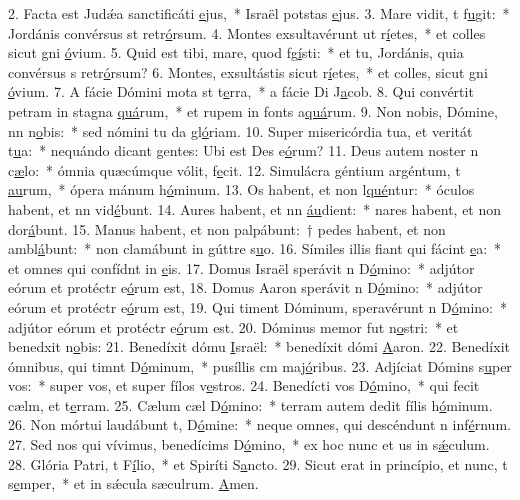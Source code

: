 2. Facta est Judǽa sanctificáti \uline{e}jus,~* Israël potstas \uline{e}jus.
3. Mare vidit, t f\uline{u}git:~* Jordánis convérsus st retr\uline{ó}rsum.
4. Montes exsultavérunt ut r\uline{í}etes,~* et colles sicut gni \uline{ó}vium.
5. Quid est tibi, mare, quod fg\uline{í}sti:~* et tu, Jordánis, quia convérsus s retr\uline{ó}rsum?
6. Montes, exsultástis sicut r\uline{í}etes,~* et colles, sicut gni \uline{ó}vium.
7. A fácie Dómini mota st t\uline{e}rra,~* a fácie Di J\uline{a}cob.
8. Qui convértit petram in stagna \uline{quá}rum,~* et rupem in fonts a\uline{quá}rum.
9. Non nobis, Dómine, nn n\uline{o}bis:~* sed nómini tu da gl\uline{ó}riam.
10. Super misericórdia tua, et veritát t\uline{u}a:~* nequándo dicant gentes: Ubi est Des e\uline{ó}rum?
11. Deus autem noster n c\uline{æ}lo:~* ómnia quæcúmque vólit, f\uline{e}cit.
12. Simulácra géntium argéntum, t \uline{au}rum,~* ópera mánum h\uline{ó}minum.
13. Os habent, et non l\uline{qué}ntur:~* óculos habent, et nn vid\uline{é}bunt.
14. Aures habent, et nn \uline{áu}dient:~* nares habent, et non dor\uline{á}bunt.
15. Manus habent, et non palpábunt:~† pedes habent, et non ambl\uline{á}bunt:~* non clamábunt in gúttre s\uline{u}o.
16. Símiles illis fiant qui fácint \uline{e}a:~* et omnes qui confídnt in \uline{e}is.
17. Domus Israël sperávit n D\uline{ó}mino:~* adjútor eórum et protéctr e\uline{ó}rum est,
18. Domus Aaron sperávit n D\uline{ó}mino:~* adjútor eórum et protéctr e\uline{ó}rum est,
19. Qui timent Dóminum, speravérunt n D\uline{ó}mino:~* adjútor eórum et protéctr e\uline{ó}rum est.
20. Dóminus memor fut n\uline{o}stri:~* et benedxit n\uline{o}bis:
21. Benedíxit dómu \uline{I}sraël:~* benedíxit dómi \uline{A}aron.
22. Benedíxit ómnibus, qui timnt D\uline{ó}minum,~* pusíllis cm maj\uline{ó}ribus.
23. Adjíciat Dómins s\uline{u}per vos:~* super vos, et super fílos v\uline{e}stros.
24. Benedícti vos  D\uline{ó}mino,~* qui fecit cælm, et t\uline{e}rram.
25. Cælum cæl D\uline{ó}mino:~* terram autem dedit fílis h\uline{ó}minum.
26. Non mórtui laudábunt t, D\uline{ó}mine:~* neque omnes, qui descéndunt n inf\uline{é}rnum.
27. Sed nos qui vívimus, benedícims D\uline{ó}mino,~* ex hoc nunc et us in s\uline{ǽ}culum.
28. Glória Patri, t F\uline{í}lio,~* et Spiríti S\uline{a}ncto.
29. Sicut erat in princípio, et nunc, t s\uline{e}mper,~* et in sǽcula sæculrum. \uline{A}men.
